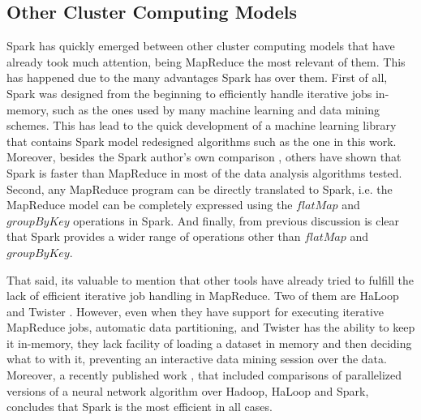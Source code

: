 \subsection{Other Cluster Computing Models}
Spark has quickly emerged between other cluster computing models that have already took much attention, being MapReduce the most relevant of them. This has happened due to the many advantages Spark has over them. First of all, Spark was designed from the beginning to efficiently handle iterative jobs in-memory, such as the ones used by many machine learning and data mining schemes. This has lead to the quick development of a machine learning library \cite{Meng2015} that contains Spark model redesigned algorithms such as the one in this work. Moreover, besides the Spark author's own comparison \cite{Zaharia2010,Zaharia2012}, others \cite{Shi2015} have shown that Spark is faster than MapReduce in most of the data analysis algorithms tested. Second, any MapReduce program can be directly translated to Spark, i.e. the MapReduce model can be completely expressed using the $flatMap$ and $groupByKey$ operations in Spark. And finally, from previous discussion is clear that Spark provides a wider range of operations other than $flatMap$ and $groupByKey$.

That said, its valuable to mention that other tools have already tried to fulfill the lack of efficient iterative job handling in MapReduce. Two of them are HaLoop \cite{Bu2010} and Twister \cite{Ekanayake2010}.  However, even when they have support for executing iterative MapReduce jobs, automatic data partitioning, and Twister has the ability to keep it in-memory, they lack  facility of loading a dataset in memory and then deciding what to with it, preventing an interactive data mining session over the data. Moreover, a recently published work \cite{Liu2016}, that included comparisons of parallelized versions of a neural network algorithm over Hadoop, HaLoop and Spark, concludes that Spark is the most efficient in all cases.

